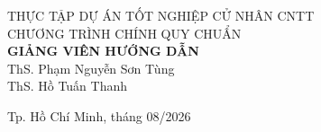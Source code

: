 \begin{titlepage}
\begin{center}
\large THỰC TẬP DỰ ÁN TỐT NGHIỆP CỬ NHÂN CNTT\\
\large CHƯƠNG TRÌNH CHÍNH QUY CHUẨN\\[1.8cm]

\textbf{GIẢNG VIÊN HƯỚNG DẪN}\\
ThS. Phạm Nguyễn Sơn Tùng\\
ThS. Hồ Tuấn Thanh\\



\vfill
Tp. Hồ Chí Minh, tháng 08/2026

\end{center}

\end{titlepage}
